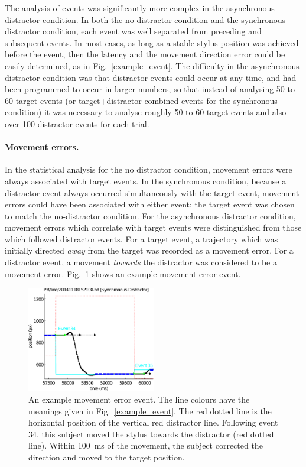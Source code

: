 \documentclass[10pt,letterpaper]{article}
\begin{document}
The analysis of events was significantly more complex in the
asynchronous distractor condition. In both the no-distractor condition
and the synchronous distractor condition, each event was well
separated from preceding and subsequent events. In most cases, as long
as a stable stylus position was achieved before the event, then the
latency and the movement direction error could be easily determined,
as in Fig.~\ref{example_event}. The difficulty in the asynchronous
distractor condition was that distractor events could occur at any
time, and had been programmed to occur in larger numbers, so that
instead of analysing 50 to 60 target events (or target+distractor
combined events for the synchronous condition) it was necessary to
analyse roughly 50 to 60 target events and also over 100 distractor
events for each trial.

\paragraph{Movement errors.} In the statistical analysis for the no
distractor condition, movement errors were always associated with
target events. In the synchronous condition, because a distractor
event always occurred simultaneously with the target event, movement
errors could have been associated with either event; the target event
was chosen to match the no-distractor condition. For the
asynchronous distractor condition, movement errors which correlate
with target events were distinguished from those which followed
distractor events. For a target event, a trajectory which was initially
directed \emph{away} from the target was recorded as a movement error. For a
distractor event, a movement \emph{towards} the distractor was considered to
be a movement error. Fig.~\ref{example_errorevent} shows an example movement
error event.

\begin{figure}[htb!]
\centering
\includegraphics[width=0.5\textwidth]{./figures/example_errorevent_nolegend.eps}
\caption[Example error event] {An example movement error event. The
  line colours have the meanings given in
  Fig.~\ref{example_event}. The red dotted line is the horizontal
  position of the vertical red distractor line. Following event 34,
  this subject moved the stylus towards the distractor (red dotted
  line). Within 100~ms of the movement, the subject corrected the
  direction and moved to the target position.}
\label{example_errorevent}
\end{figure}
\end{document}
